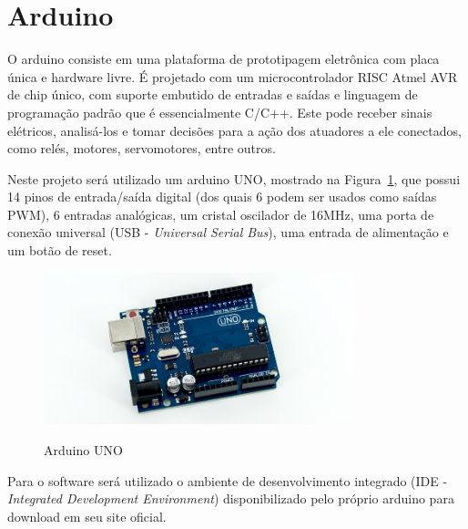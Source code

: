 
\section{Arduino}
\label{sec:arduino}

O arduino consiste em uma plataforma de prototipagem eletrônica com placa única e hardware livre. É projetado com um microcontrolador RISC Atmel AVR de chip único, com suporte embutido de entradas e saídas e linguagem de programação padrão que é essencialmente C/C++. Este pode receber sinais elétricos, analisá-los e tomar decisões para a ação dos atuadores a ele conectados, como relés, motores, servomotores, entre outros.

Neste projeto será utilizado um arduino UNO, mostrado na Figura~\ref{fig:arduino-uno}, que possui 14 pinos de entrada/saída digital (dos quais 6 podem ser usados como saídas PWM), 6 entradas analógicas, um cristal oscilador de 16MHz, uma porta de conexão universal (USB - \textit{Universal Serial Bus}), uma entrada de alimentação e um botão de reset.

\begin{figure}[!hbtp]
  \centering
   \caption{Arduino UNO}
    \includegraphics[width = 0.8\textwidth]{Caps/Figs/mat-met/arduino.png}
   \label{fig:arduino-uno}
\end{figure}

Para o software será utilizado o ambiente de desenvolvimento integrado (IDE - \textit{Integrated Development Environment}) disponibilizado pelo próprio arduino para download em seu site oficial.


